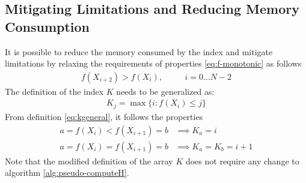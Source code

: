\documentclass[preprint,1p,times]{elsarticle}
\begin{document}
\subsection{Mitigating Limitations and Reducing Memory Consumption}
\label{sec:bucketpairs}
It is possible to reduce the memory consumed by the index and mitigate limitations by relaxing the requirements of properties \eqref{eq:f-monotonic} as follows
\begin{align}
\label{eq:f-monotonic-2}
f(X_{i+2}) > f(X_i), &&\quad  i=0 \dots N-2
\end{align}
The definition of the index $K$ needs to be generalized as:
\begin{align}
\label{eq:kgeneral}
	K_j = \max\{i: f(X_i) \leq j\}
\end{align}
From definition \eqref{eq:kgeneral}, it follows the properties
\begin{subequations}
\label{eq:kgeneralprop}
\begin{align}
\label{eq:kgeneralprop1}
    a=f(X_{i})<f(X_{i+1})=b &\implies K_a=i \\
\label{eq:kgeneralprop2}    
    a=f(X_{i})=f(X_{i+1})=b &\implies K_a=K_b=i+1
\end{align}
\end{subequations}
Note that the modified definition of the array $K$ does not require any change to algorithm \eqref{alg:pseudo-computeH}. \\
\end{document}
